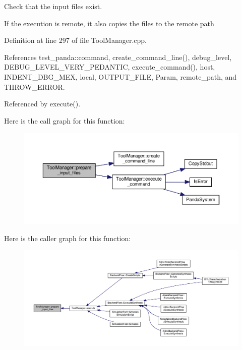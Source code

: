 Check that the input files exist. 

If the execution is remote, it also copies the files to the remote path 

Definition at line 297 of file Tool\+Manager.\+cpp.



References test\+\_\+panda\+::command, create\+\_\+command\+\_\+line(), debug\+\_\+level, D\+E\+B\+U\+G\+\_\+\+L\+E\+V\+E\+L\+\_\+\+V\+E\+R\+Y\+\_\+\+P\+E\+D\+A\+N\+T\+IC, execute\+\_\+command(), host, I\+N\+D\+E\+N\+T\+\_\+\+D\+B\+G\+\_\+\+M\+EX, local, O\+U\+T\+P\+U\+T\+\_\+\+F\+I\+LE, Param, remote\+\_\+path, and T\+H\+R\+O\+W\+\_\+\+E\+R\+R\+OR.



Referenced by execute().

Here is the call graph for this function\+:
\nopagebreak
\begin{figure}[H]
\begin{center}
\leavevmode
\includegraphics[width=350pt]{dc/dc5/classToolManager_ac300930662a619e8d71346241f766d5a_cgraph}
\end{center}
\end{figure}
Here is the caller graph for this function\+:
\nopagebreak
\begin{figure}[H]
\begin{center}
\leavevmode
\includegraphics[width=350pt]{dc/dc5/classToolManager_ac300930662a619e8d71346241f766d5a_icgraph}
\end{center}
\end{figure}
\mbox{\label{classToolManager_a9fa29cf550d563627666c294e8a38855}} 

